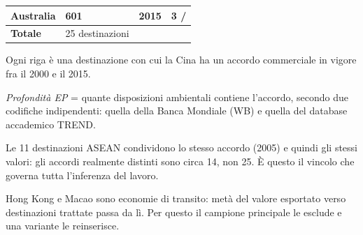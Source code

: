 \begin{table}[htbp]
\begin{threeparttable}
\begin{tabular}{llcc}
Australia & 601 & 2015 & 3 \quad / \quad 24 \\
\midrule
\textbf{Totale} & 25 destinazioni & & \\
\bottomrule
\end{tabular}
\begin{tablenotes}[flushleft]\footnotesize
\item Ogni riga \`e una destinazione con cui la Cina ha un accordo commerciale in vigore fra il 2000 e il 2015.
\item \textit{Profondit\`a EP} = quante disposizioni ambientali contiene l'accordo, secondo due codifiche indipendenti: quella della Banca Mondiale (WB) e quella del database accademico TREND.
\item Le 11 destinazioni ASEAN condividono lo stesso accordo (2005) e quindi gli stessi valori: gli accordi realmente distinti sono circa 14, non 25. \`E questo il vincolo che governa tutta l'inferenza del lavoro.
\item Hong Kong e Macao sono economie di transito: met\`a del valore esportato verso destinazioni trattate passa da l\`i. Per questo il campione principale le esclude e una variante le reinserisce.
\end{tablenotes}
\end{threeparttable}
\end{table}
